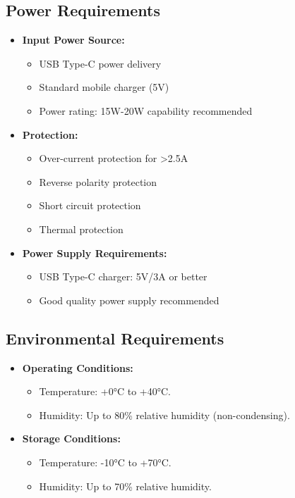 \documentclass[a4paper,12pt]{article}
\begin{document}
\subsection{Power Requirements}
\begin{itemize}
    \item \textbf{Input Power Source:}
    \begin{itemize}
        \item USB Type-C power delivery
        \item Standard mobile charger (5V)
        \item Power rating: 15W-20W capability recommended
    \end{itemize}
    \item \textbf{Protection:}
    \begin{itemize}
        \item Over-current protection for >2.5A
        \item Reverse polarity protection
        \item Short circuit protection
        \item Thermal protection
    \end{itemize}
    \item \textbf{Power Supply Requirements:}
    \begin{itemize}
        \item USB Type-C charger: 5V/3A or better
        \item Good quality power supply recommended
    \end{itemize}
\end{itemize}

\subsection{Environmental Requirements}
\begin{itemize}
    \item \textbf{Operating Conditions:}
    \begin{itemize}
        \item Temperature: +0°C to +40°C.
        \item Humidity: Up to 80\% relative humidity (non-condensing).
    \end{itemize}
    \item \textbf{Storage Conditions:}
    \begin{itemize}
        \item Temperature: -10°C to +70°C.
        \item Humidity: Up to 70\% relative humidity.
    \end{itemize}
\end{itemize}
\end{document}
